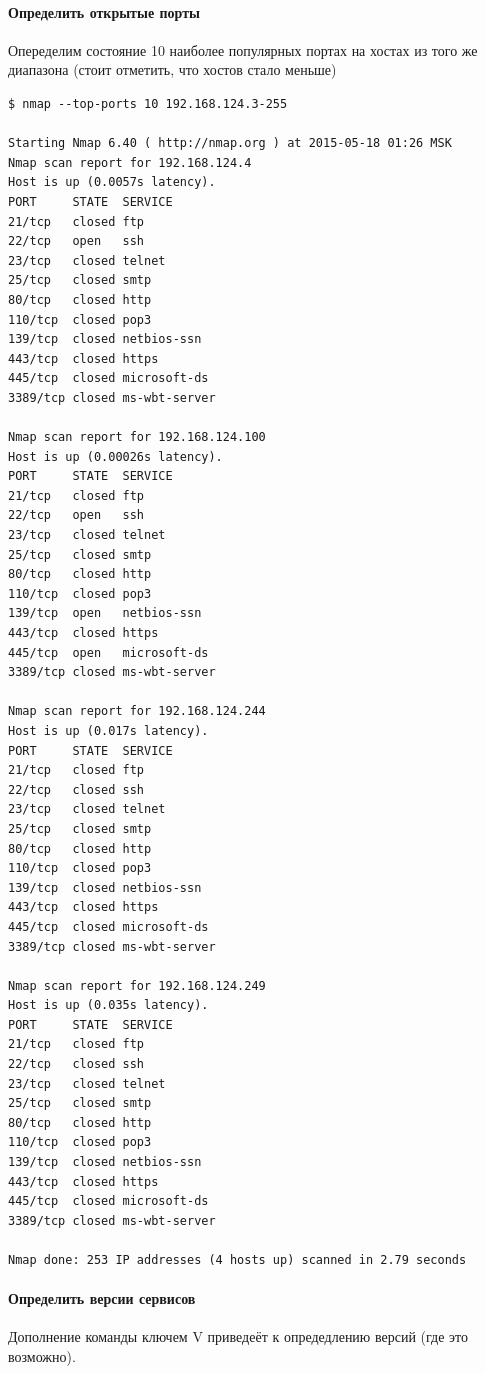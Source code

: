 \documentclass[a4paper, 12pt]{article}		%
\begin{document}
\paragraph{Определить открытые порты}

Опеределим состояние 10 наиболее популярных портах на хостах из того же диапазона (стоит отметить, что хостов стало меньше)

\begin{Verbatim}[frame=single]
$ nmap --top-ports 10 192.168.124.3-255

Starting Nmap 6.40 ( http://nmap.org ) at 2015-05-18 01:26 MSK
Nmap scan report for 192.168.124.4
Host is up (0.0057s latency).
PORT     STATE  SERVICE
21/tcp   closed ftp
22/tcp   open   ssh
23/tcp   closed telnet
25/tcp   closed smtp
80/tcp   closed http
110/tcp  closed pop3
139/tcp  closed netbios-ssn
443/tcp  closed https
445/tcp  closed microsoft-ds
3389/tcp closed ms-wbt-server

Nmap scan report for 192.168.124.100
Host is up (0.00026s latency).
PORT     STATE  SERVICE
21/tcp   closed ftp
22/tcp   open   ssh
23/tcp   closed telnet
25/tcp   closed smtp
80/tcp   closed http
110/tcp  closed pop3
139/tcp  open   netbios-ssn
443/tcp  closed https
445/tcp  open   microsoft-ds
3389/tcp closed ms-wbt-server

Nmap scan report for 192.168.124.244
Host is up (0.017s latency).
PORT     STATE  SERVICE
21/tcp   closed ftp
22/tcp   closed ssh
23/tcp   closed telnet
25/tcp   closed smtp
80/tcp   closed http
110/tcp  closed pop3
139/tcp  closed netbios-ssn
443/tcp  closed https
445/tcp  closed microsoft-ds
3389/tcp closed ms-wbt-server

Nmap scan report for 192.168.124.249
Host is up (0.035s latency).
PORT     STATE  SERVICE
21/tcp   closed ftp
22/tcp   closed ssh
23/tcp   closed telnet
25/tcp   closed smtp
80/tcp   closed http
110/tcp  closed pop3
139/tcp  closed netbios-ssn
443/tcp  closed https
445/tcp  closed microsoft-ds
3389/tcp closed ms-wbt-server

Nmap done: 253 IP addresses (4 hosts up) scanned in 2.79 seconds
\end{Verbatim}

\paragraph{Определить версии сервисов} Дополнение команды ключем V приведеёт к опредедлению версий (где это возможно).
\end{document}

